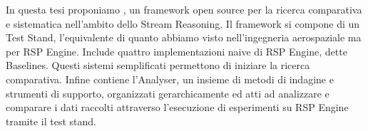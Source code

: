In questa tesi proponiamo \namens, un framework open source per la ricerca comparativa e sistematica nell'ambito dello Stream Reasoning. Il framework si compone di un Test Stand, l'equivalente di quanto abbiamo visto nell'ingegneria aerospaziale ma per RSP Engine. Include quattro implementazioni naive di RSP Engine, dette Baselines. Questi sistemi semplificati permettono di iniziare la ricerca comparativa. Infine \name contiene l'Analyser, un insieme di metodi di indagine e strumenti di supporto, organizzati gerarchicamente ed atti ad analizzare e comparare i dati raccolti attraverso l'esecuzione di esperimenti su RSP Engine tramite il test stand.
